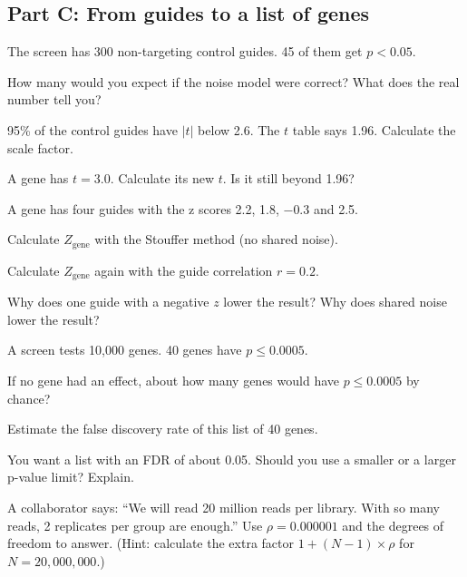 \subsection*{Part C: From guides to a list of genes}
\begin{exlist}[resume*=ex2]
\item \tagcalc{} \tagdecide{} The screen has 300 non-targeting control
guides. 45 of them get $p < 0.05$.
\begin{parts}
\item How many would you expect if the noise model were correct? What does
  the real number tell you?
\item 95\% of the control guides have $|t|$ below 2.6. The $t$ table says
  1.96. Calculate the scale factor.
\item A gene has $t = 3.0$. Calculate its new $t$. Is it still beyond 1.96?
\end{parts}

\item \tagcalc{} \tagexplain{} A gene has four guides with the z scores 2.2,
1.8, $-0.3$ and 2.5.
\begin{parts}
\item Calculate $Z_{\text{gene}}$ with the Stouffer method (no shared
  noise).
\item Calculate $Z_{\text{gene}}$ again with the guide correlation
  $r = 0.2$.
\item Why does one guide with a negative $z$ lower the result? Why does
  shared noise lower the result?
\end{parts}

\item \tagcalc{} \tagdecide{} A screen tests 10{,}000 genes. 40 genes have
$p \le 0.0005$.
\begin{parts}
\item If no gene had an effect, about how many genes would have
  $p \le 0.0005$ by chance?
\item Estimate the false discovery rate of this list of 40 genes.
\item You want a list with an FDR of about 0.05. Should you use a smaller or
  a larger p-value limit? Explain.
\end{parts}

\item \tagdecide{} \tagexplain{} A collaborator says: ``We will read 20
million reads per library. With so many reads, 2 replicates per group are
enough.'' Use $\rho = 0.000001$ and the degrees of freedom to answer.
(Hint: calculate the extra factor $1 + (N-1) \times \rho$ for
$N = 20{,}000{,}000$.)


\end{exlist}
